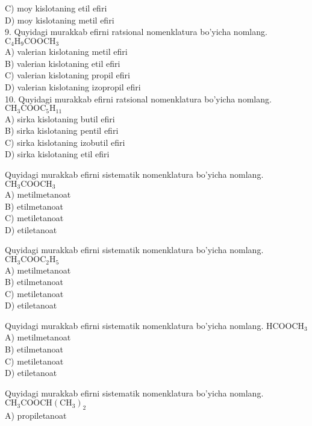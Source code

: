 C) moy kislotaning etil efiri\\
D) moy kislotaning metil efiri\\
9. Quyidagi murakkab efirni ratsional nomenklatura bo'yicha nomlang.\\
$\mathrm{C}_{4} \mathrm{H}_{9} \mathrm{COOCH}_{3}$\\
A) valerian kislotaning metil efiri\\
B) valerian kislotaning etil efiri\\
C) valerian kislotaning propil efiri\\
D) valerian kislotaning izopropil efiri\\
10. Quyidagi murakkab efirni ratsional nomenklatura bo'yicha nomlang.\\
$\mathrm{CH}_{3} \mathrm{COOC}_{5} \mathrm{H}_{11}$\\
A) sirka kislotaning butil efiri\\
B) sirka kislotaning pentil efiri\\
C) sirka kislotaning izobutil efiri\\
D) sirka kislotaning etil efiri
  \item Quyidagi murakkab efirni sistematik nomenklatura bo'yicha nomlang.\\
$\mathrm{CH}_{3} \mathrm{COOCH}_{3}$\\
A) metilmetanoat\\
B) etilmetanoat\\
C) metiletanoat\\
D) etiletanoat
  \item Quyidagi murakkab efirni sistematik nomenklatura bo'yicha nomlang. $\mathrm{CH}_{3} \mathrm{COOC}_{2} \mathrm{H}_{5}$\\
A) metilmetanoat\\
B) etilmetanoat\\
C) metiletanoat\\
D) etiletanoat
  \item Quyidagi murakkab efirni sistematik nomenklatura bo'yicha nomlang. $\mathrm{HCOOCH}_{3}$\\
A) metilmetanoat\\
B) etilmetanoat\\
C) metiletanoat\\
D) etiletanoat
  \item Quyidagi murakkab efirni sistematik nomenklatura bo'yicha nomlang.\\
$\mathrm{CH}_{3} \mathrm{COOCH}\left(\mathrm{CH}_{3}\right)_{2}$\\
A) propiletanoat\\
